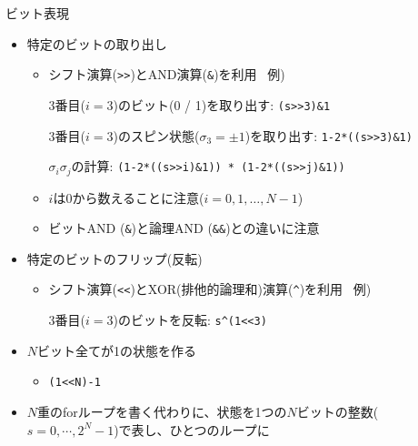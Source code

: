 
\begin{frame}[t,fragile]{ビット表現}
  \begin{itemize}
  \item 特定のビットの取り出し
    \begin{itemize}
    \item シフト演算(\verb+>>+)とAND演算(\verb+&+)を利用 \ 例)

      3番目($i=3$)のビット(0 / 1)を取り出す: \verb+(s>>3)&1+

      3番目($i=3$)のスピン状態($\sigma_3 = \pm 1$)を取り出す: \verb+1-2*((s>>3)&1)+

      $\sigma_i \sigma_j$の計算: \verb+(1-2*((s>>i)&1)) * (1-2*((s>>j)&1))+

    \item {\color{red} $i$は0から数える}ことに注意($i=0,1,\ldots,N-1$)
    \item ビットAND (\verb+&+)と論理AND (\verb+&&+)との違いに注意
    \end{itemize}
  \item 特定のビットのフリップ(反転)
    \begin{itemize}
    \item シフト演算(\verb+<<+)とXOR(排他的論理和)演算(\verb+^+)を利用 \ 例)
      
      3番目($i=3$)のビットを反転: \verb+s^(1<<3)+
    \end{itemize}
  \item $N$ビット全てが1の状態を作る
    \begin{itemize}
    \item \verb+(1<<N)-1+
    \end{itemize}
  \item $N$重のforループを書く代わりに、状態を1つの$N$ビットの整数($s=0,\cdots,2^N-1$)で表し、ひとつのループに
  \end{itemize}
\end{frame}
